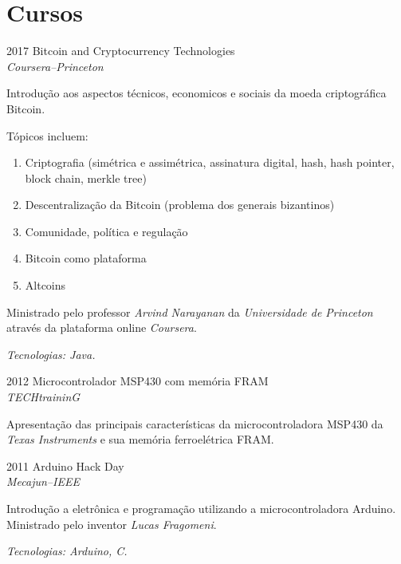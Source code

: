 \documentclass[a4paper]{simplecv}
\begin{document}
\section{Cursos}

\begin{topic}
\item[2017] Bitcoin and Cryptocurrency Technologies\\
	{\em\small Coursera--Princeton}

	Introdução aos aspectos técnicos, economicos e sociais da moeda
	criptográfica Bitcoin.

	Tópicos incluem:
	\begin{enumerate}
		\item Criptografia (simétrica e assimétrica, assinatura
			digital, hash, hash pointer, block chain, merkle tree)
		\item Descentralização da Bitcoin (problema dos generais
			bizantinos)
		\item Comunidade, política e regulação
		\item Bitcoin como plataforma
		\item Altcoins
	\end{enumerate}

	Ministrado pelo professor \emph{Arvind Narayanan} da
	\emph{Universidade de Princeton} através da plataforma online
	\emph{Coursera}.

	{\em\scriptsize Tecnologias: Java.}

%
%

\item[2012] Microcontrolador MSP430 com memória FRAM\\
	{\em\small TECHtraininG}

	Apresentação das principais características da microcontroladora MSP430
	da \emph{Texas Instruments} e sua memória ferroelétrica FRAM.

\item[2011] Arduino Hack Day\\
	{\em\small Mecajun--IEEE}

	Introdução a eletrônica e programação utilizando a microcontroladora
	Arduino. Ministrado pelo inventor \emph{Lucas Fragomeni}.

	{\em\scriptsize Tecnologias: Arduino, C.}

\end{topic}
\end{document}
